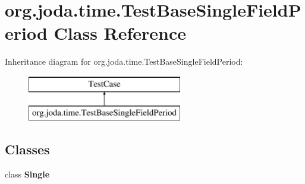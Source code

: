 \hypertarget{classorg_1_1joda_1_1time_1_1_test_base_single_field_period}{\section{org.\-joda.\-time.\-Test\-Base\-Single\-Field\-Period Class Reference}
\label{classorg_1_1joda_1_1time_1_1_test_base_single_field_period}
}
Inheritance diagram for org.\-joda.\-time.\-Test\-Base\-Single\-Field\-Period\-:\begin{figure}[H]
\begin{center}
\leavevmode
\includegraphics[height=2.000000cm]{classorg_1_1joda_1_1time_1_1_test_base_single_field_period}
\end{center}
\end{figure}
\subsection*{Classes}
\begin{DoxyCompactItemize}
\item 
class {\bfseries Single}
\end{DoxyCompactItemize}
